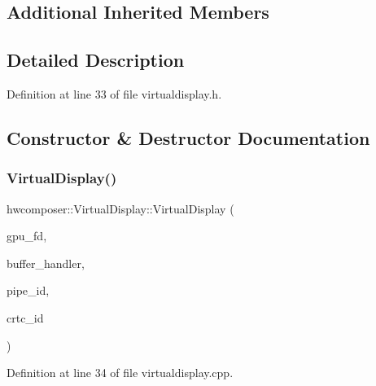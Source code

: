 \subsection*{Additional Inherited Members}


\subsection{Detailed Description}


Definition at line 33 of file virtualdisplay.\+h.



\subsection{Constructor \& Destructor Documentation}
\mbox{\label{classhwcomposer_1_1VirtualDisplay_a2759b53ddb478ce683047ac616c8c5c7}} 
\subsubsection{\texorpdfstring{Virtual\+Display()}{VirtualDisplay()}\hspace{0.1cm}{\footnotesize\ttfamily [1/2]}}
{\footnotesize\ttfamily hwcomposer\+::\+Virtual\+Display\+::\+Virtual\+Display (\begin{DoxyParamCaption}\item[{uint32\+\_\+t}]{gpu\+\_\+fd,  }\item[{\mbox{\hyperlink{classhwcomposer_1_1NativeBufferHandler}{Native\+Buffer\+Handler}} $\ast$}]{buffer\+\_\+handler,  }\item[{uint32\+\_\+t}]{pipe\+\_\+id,  }\item[{uint32\+\_\+t}]{crtc\+\_\+id }\end{DoxyParamCaption})}



Definition at line 34 of file virtualdisplay.\+cpp.


